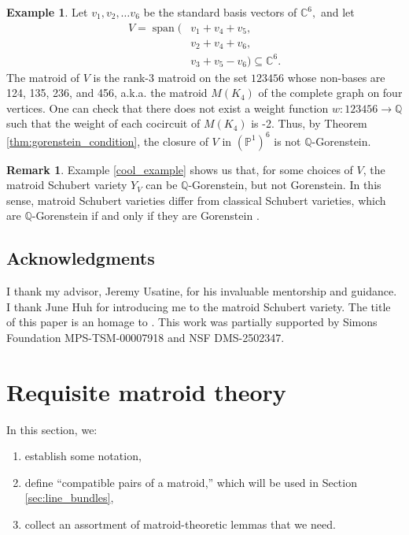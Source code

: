 \documentclass{amsart}
\theoremstyle{plain}
\theoremstyle{definition}
\newtheorem{example}[theorem]{Example}
\newtheorem{remark}[theorem]{Remark}
\newcommand{\Span}{\operatorname{span}}
\begin{document}
\begin{example}
Let $v_1,v_2,\dots v_6$ be the standard basis vectors of $\mathbb{C}^6,$ and let 
\begin{equation*}
\begin{split}
V = \Span(& v_1+v_4+v_5, \\ & v_2+v_4+v_6, \\ & v_3 + v_5 - v_6) \subseteq \mathbb{C}^6.
\end{split}    
\end{equation*}
The matroid of $V$ is the rank-3 matroid on the set $123456$ whose non-bases are 124, 135, 236, and 456, a.k.a. the matroid $M(K_4)$ of the complete graph on four vertices. One can check that there does not exist a weight function $w: 123456 \to \mathbb{Q}$ such that the weight of each cocircuit of $M(K_4)$ is -2.
Thus, by Theorem \ref{thm:gorenstein_condition}, the closure of $V$ in $(\mathbb{P}^1)^6$ is not $\mathbb{Q}$-Gorenstein.
\end{example}

\begin{remark}
Example \ref{cool_example} shows us that, for some choices of $V$, the matroid Schubert variety $Y_V$ can be $\mathbb{Q}$-Gorenstein, but not Gorenstein. In this sense, matroid Schubert varieties differ from classical Schubert varieties, which are $\mathbb{Q}$-Gorenstein if and only if they are Gorenstein \cite[Section 3]{woo_yong}.
\end{remark}

\subsection*{Acknowledgments} I thank my advisor, Jeremy Usatine, for his invaluable mentorship and guidance. I thank June Huh for introducing me to the matroid Schubert variety. The title of this paper is an homage to \cite{woo_yong}. This work was partially supported by Simons Foundation MPS-TSM-00007918 and NSF DMS-2502347.

\section{Requisite matroid theory}
In this section, we:
\begin{enumerate}
    \item[(1)] establish some notation,
    \item[(2)] define ``compatible pairs of a matroid,'' which will be used in Section \ref{sec:line_bundles},
    \item[(3)] collect an assortment of matroid-theoretic lemmas that we need.
\end{enumerate}
\end{document}
